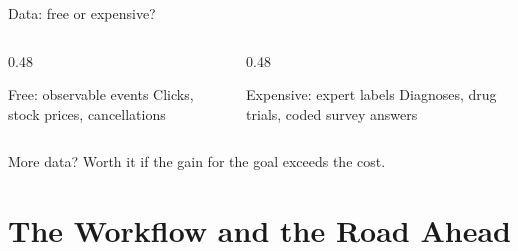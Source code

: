 \documentclass[handout,aspectratio=169,t,9pt]{beamer}
\begin{document}
\begin{frame}{Data: free or expensive?}
  \begin{columns}[T,onlytextwidth]
    \begin{column}{0.48\textwidth}
      \begin{sibbox}{Free: observable events}
        Clicks, stock prices, cancellations
      \end{sibbox}
    \end{column}
    \begin{column}{0.48\textwidth}
      \begin{sibbox}{Expensive: expert labels}
        Diagnoses, drug trials, coded survey answers
      \end{sibbox}
    \end{column}
  \end{columns}

  \vfill
  \begin{keypoint}{More data?}
    Worth it if the gain for the goal exceeds the cost.
  \end{keypoint}

\end{frame}

\section{The Workflow and the Road Ahead}
\end{document}

